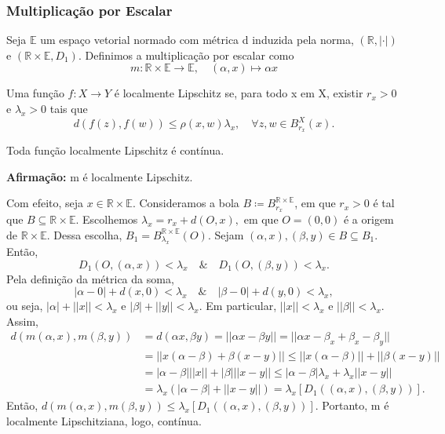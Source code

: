 \documentclass[MetricSpaces/metric_notes.tex]{subfiles}
\begin{document}
\subsubsection{Multiplicação por Escalar}
Seja \(\mathbb{E}\) um espaço vetorial normado com métrica d induzida pela norma, \((\mathbb{R}, |\cdot |)\) e \((\mathbb{R}\times \mathbb{E}, D_{1})\).
Definimos a multiplicação por escalar como
\[
	m:\mathbb{R}\times \mathbb{E}\rightarrow \mathbb{E},\quad (\alpha ,x)\mapsto \alpha x
\]
\begin{def*}
	Uma função \(f:X\rightarrow Y\) é localmente Lipschitz se, para todo x em X, existir \(r_{x}>0\) e \(\lambda_{x}>0\) tais que
	\[
		d(f(z), f(w))\leq \rho (x, w)\lambda_{x},\quad \forall z, w\in B_{r_{x}}^{X}(x).
	\]
\end{def*}
Toda função localmente Lipschitz é contínua.

\textbf{Afirmação:} m é localmente Lipschitz.

Com efeito, seja \(x\in \mathbb{R}\times \mathbb{E}\). Consideramos a bola \(B\coloneqq B_{r_{x}}^{\mathbb{R}\times \mathbb{E}}\), em que \(r_{x}>0\)
é tal que \(B\subseteq{\mathbb{R}\times \mathbb{E}}.\) Escolhemos \(\lambda_{x} = r_{x}+d(O, x),\) em que \(O = (0, 0)\) é a origem
de \(\mathbb{R}\times \mathbb{E}.\) Dessa escolha, \(B_{1}=B_{\lambda_{x}}^{\mathbb{R}\times \mathbb{E}}(O)\). Sejam \((\alpha , x), (\beta, y)\in B\subseteq{B_{1}}.\)
Então,
\[
	D_{1}(O, (\alpha , x)) < \lambda_{x}\quad\&\quad D_{1}(O, (\beta, y)) < \lambda_{x}.
\]
Pela definição da métrica da soma,
\[
	|\alpha - 0| + d(x, 0) < \lambda_{x}\quad\&\quad |\beta - 0| + d(y, 0) < \lambda_{x},
\]
ou seja, \(|\alpha | + ||x|| < \lambda_{x}\) e \(|\beta |+||y||<\lambda_{x}\). Em particular, \(||x|| < \lambda_{x}\) e \(||\beta || < \lambda_{x}\). Assim,
\begin{align*}
	d(m(\alpha, x), m(\beta, y)) & = d(\alpha x, \beta y) = ||\alpha x - \beta y|| = ||\alpha x-\beta _{x}+\beta _{x}-\beta _{y}|| \\
	                             & =||x(\alpha -\beta ) + \beta (x-y)||\leq ||x(\alpha -\beta )|| + ||\beta (x-y)||                \\
	                             & =|\alpha -\beta |||x||+|\beta |||x-y||\leq |\alpha -\beta |\lambda_{x} + \lambda_{x}||x-y||     \\
	                             & =\lambda_{x}(|\alpha -\beta | + ||x-y||) = \lambda_{x}[D_{1}((\alpha , x), (\beta , y))].
\end{align*}
Então, \(d(m(\alpha , x), m(\beta , y))\leq \lambda_{x}[D_{1}((\alpha, x), (\beta , y))] \). Portanto, m é localmente Lipschitziana, logo, contínua.
\end{document}
